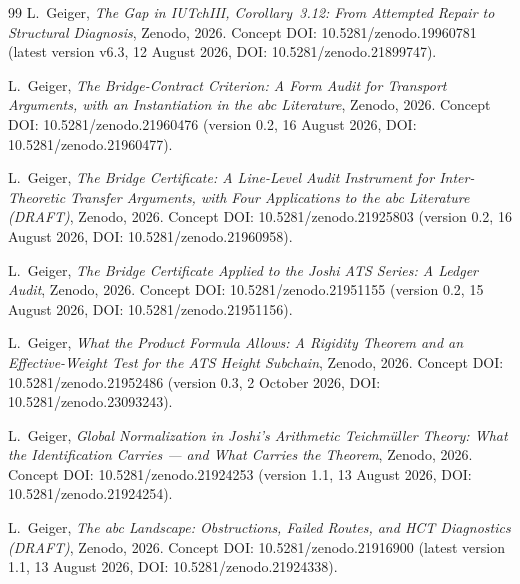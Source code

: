 \documentclass[11pt,a4paper]{article}
\theoremstyle{definition}
\theoremstyle{remark}
\begin{document}
\begin{thebibliography}{99}
L.~Geiger,
\emph{The Gap in IUTchIII, Corollary~3.12: From Attempted Repair to
Structural Diagnosis},
Zenodo, 2026.
Concept DOI: 10.5281/zenodo.19960781
(latest version v6.3, 12 August 2026, DOI: 10.5281/zenodo.21899747).

L.~Geiger,
\emph{The Bridge-Contract Criterion: A Form Audit for Transport Arguments,
with an Instantiation in the abc Literature},
Zenodo, 2026.
Concept DOI: 10.5281/zenodo.21960476
(version 0.2, 16 August 2026, DOI: 10.5281/zenodo.21960477).

L.~Geiger,
\emph{The Bridge Certificate: A Line-Level Audit Instrument for
Inter-Theoretic Transfer Arguments, with Four Applications to the abc
Literature (DRAFT)},
Zenodo, 2026.
Concept DOI: 10.5281/zenodo.21925803
(version 0.2, 16 August 2026, DOI: 10.5281/zenodo.21960958).

L.~Geiger,
\emph{The Bridge Certificate Applied to the Joshi ATS Series: A Ledger
Audit},
Zenodo, 2026.
Concept DOI: 10.5281/zenodo.21951155
(version 0.2, 15 August 2026, DOI: 10.5281/zenodo.21951156).

L.~Geiger,
\emph{What the Product Formula Allows: A Rigidity Theorem and an
Effective-Weight Test for the ATS Height Subchain},
Zenodo, 2026.
Concept DOI: 10.5281/zenodo.21952486
(version 0.3, 2 October 2026, DOI: 10.5281/zenodo.23093243).

L.~Geiger,
\emph{Global Normalization in Joshi's Arithmetic Teichm\"{u}ller Theory: What
the Identification Carries --- and What Carries the Theorem},
Zenodo, 2026.
Concept DOI: 10.5281/zenodo.21924253
(version 1.1, 13 August 2026, DOI: 10.5281/zenodo.21924254).

L.~Geiger,
\emph{The abc Landscape: Obstructions, Failed Routes, and HCT Diagnostics
(DRAFT)},
Zenodo, 2026.
Concept DOI: 10.5281/zenodo.21916900
(latest version 1.1, 13 August 2026, DOI: 10.5281/zenodo.21924338).

\end{thebibliography}
\end{document}
